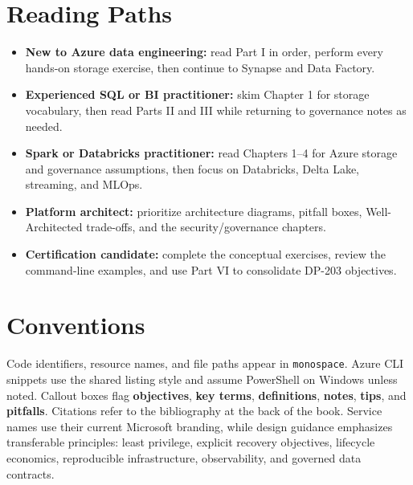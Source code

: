 \section*{Reading Paths}
\begin{itemize}
    \item \textbf{New to Azure data engineering:} read Part I in order, perform every hands-on storage exercise, then continue to Synapse and Data Factory.
    \item \textbf{Experienced SQL or BI practitioner:} skim Chapter 1 for storage vocabulary, then read Parts II and III while returning to governance notes as needed.
    \item \textbf{Spark or Databricks practitioner:} read Chapters 1--4 for Azure storage and governance assumptions, then focus on Databricks, Delta Lake, streaming, and MLOps.
    \item \textbf{Platform architect:} prioritize architecture diagrams, pitfall boxes, Well-Architected trade-offs, and the security/governance chapters.
    \item \textbf{Certification candidate:} complete the conceptual exercises, review the command-line examples, and use Part VI to consolidate DP-203 objectives.
\end{itemize}

\section*{Conventions}
Code identifiers, resource names, and file paths appear in \texttt{monospace}. Azure CLI snippets use the shared listing style and assume PowerShell on Windows unless noted. Callout boxes flag \textbf{objectives}, \textbf{key terms}, \textbf{definitions}, \textbf{notes}, \textbf{tips}, and \textbf{pitfalls}. Citations refer to the bibliography at the back of the book. Service names use their current Microsoft branding, while design guidance emphasizes transferable principles: least privilege, explicit recovery objectives, lifecycle economics, reproducible infrastructure, observability, and governed data contracts.
